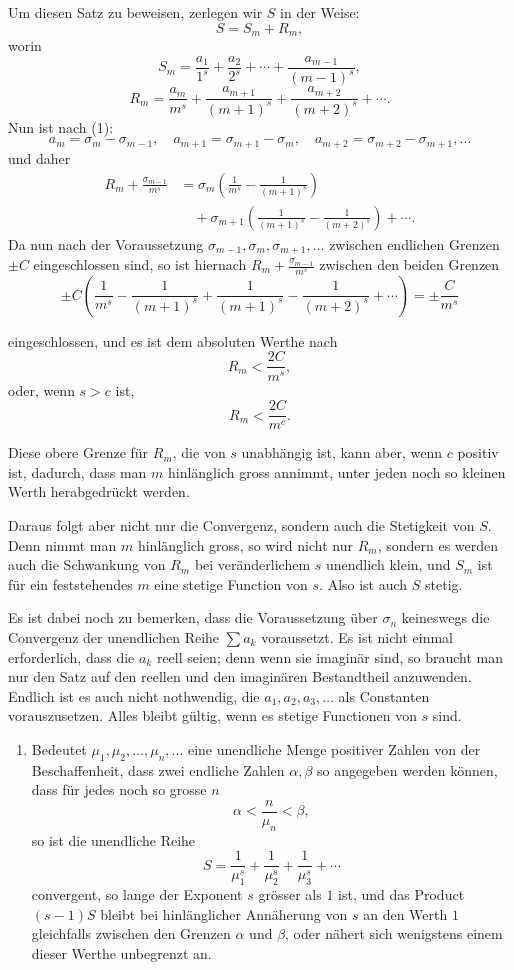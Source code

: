 \documentclass[11pt]{article}
\begin{document}
Um diesen Satz zu beweisen, zerlegen wir $S$ in der Weise:
\[
S=S_m+R_m,
\]
worin
\[
S_m=\frac{a_1}{1^s}+\frac{a_2}{2^s}+\cdots+\frac{a_{m-1}}{(m-1)^s},
\]
\[
R_m=\frac{a_m}{m^s}+\frac{a_{m+1}}{(m+1)^s}+\frac{a_{m+2}}{(m+2)^s}+\cdots .
\]
Nun ist nach (1):
\[
a_m=\sigma_m-\sigma_{m-1},\quad a_{m+1}=\sigma_{m+1}-\sigma_m,\quad
a_{m+2}=\sigma_{m+2}-\sigma_{m+1},\ldots
\]
und daher
\[
\begin{aligned}
R_m+\frac{\sigma_{m-1}}{m^s}
&=\sigma_m\left(\frac1{m^s}-\frac1{(m+1)^s}\right)\\
&\quad+\sigma_{m+1}\left(\frac1{(m+1)^s}-\frac1{(m+2)^s}\right)+\cdots .
\end{aligned}
\]
Da nun nach der Voraussetzung $\sigma_{m-1},\sigma_m,\sigma_{m+1},\ldots$ zwischen endlichen Grenzen $\pm C$ eingeschlossen sind, so ist hiernach $R_m+\frac{\sigma_{m-1}}{m^s}$ zwischen den beiden Grenzen
\[
\pm C\left(\frac1{m^s}-\frac1{(m+1)^s}+\frac1{(m+1)^s}-\frac1{(m+2)^s}+\cdots\right)
=\pm\frac{C}{m^s}
\]

eingeschlossen, und es ist dem absoluten Werthe nach
\[
R_m<\frac{2C}{m^s},
\]
oder, wenn $s>c$ ist,
\[
R_m<\frac{2C}{m^c}.
\]

Diese obere Grenze für $R_m$, die von $s$ unabhängig ist, kann aber, wenn $c$ positiv ist, dadurch, dass man $m$ hinlänglich gross annimmt, unter jeden noch so kleinen Werth herabgedrückt werden.

Daraus folgt aber nicht nur die Convergenz, sondern auch die Stetigkeit von $S$. Denn nimmt man $m$ hinlänglich gross, so wird nicht nur $R_m$, sondern es werden auch die Schwankung von $R_m$ bei veränderlichem $s$ unendlich klein, und $S_m$ ist für ein feststehendes $m$ eine stetige Function von $s$. Also ist auch $S$ stetig.

Es ist dabei noch zu bemerken, dass die Voraussetzung über $\sigma_n$ keineswegs die Convergenz der unendlichen Reihe $\sum a_k$ voraussetzt. Es ist nicht einmal erforderlich, dass die $a_k$ reell seien; denn wenn sie imaginär sind, so braucht man nur den Satz auf den reellen und den imaginären Bestandtheil anzuwenden. Endlich ist es auch nicht nothwendig, die $a_1,a_2,a_3,\ldots$ als Constanten vorauszusetzen. Alles bleibt gültig, wenn es stetige Functionen von $s$ sind.

\begin{enumerate}[label=\textbf{\arabic*.},leftmargin=2.2em,start=2]
\item Bedeutet $\mu_1,\mu_2,\ldots,\mu_n,\ldots$ eine unendliche Menge positiver Zahlen von der Beschaffenheit, dass zwei endliche Zahlen $\alpha,\beta$ so angegeben werden können, dass für jedes noch so grosse $n$
\begin{equation}
\alpha<\frac{n}{\mu_n}<\beta,
\tag{3}
\end{equation}
so ist die unendliche Reihe
\[
S=\frac1{\mu_1^s}+\frac1{\mu_2^s}+\frac1{\mu_3^s}+\cdots
\]
convergent, so lange der Exponent $s$ grösser als $1$ ist, und das Product $(s-1)S$ bleibt bei hinlänglicher Annäherung von $s$ an den Werth $1$ gleichfalls zwischen den Grenzen $\alpha$ und $\beta$, oder nähert sich wenigstens einem dieser Werthe unbegrenzt an.
\end{enumerate}
\end{document}
